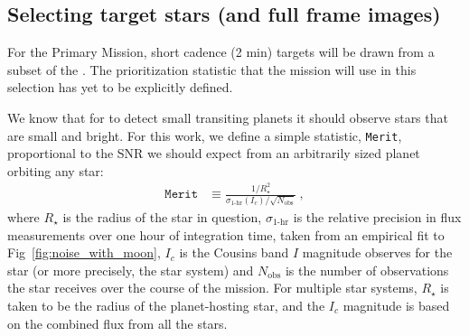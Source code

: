 \subsection{Selecting target stars (and full frame images)}
\label{sec:selection_criteria}
For the Primary Mission, \tesss short cadence (2 min) targets will be drawn from a subset of the \tic. 
The prioritization statistic that the mission will use in this selection has yet to be explicitly defined.

We know that for \tess to detect small transiting planets
it should observe stars that are small and bright.  For this work, we
define a simple statistic, \texttt{Merit}, proportional to the SNR we
should expect from an arbitrarily sized planet orbiting any star:
\begin{align}
\texttt{Merit} &\equiv 
	\frac{1/R_\star^2}{\sigma_\text{1-hr}(I_c)/\sqrt{N_\text{obs}}}\ ,
\label{eq:merit}
\end{align}
where $R_\star$ is the radius of the star in question,
$\sigma_\text{1-hr}$ is the relative precision in flux measurements
over one hour of integration time, taken from an empirical fit to
Fig~\ref{fig:noise_with_moon}, $I_c$ is the Cousins band $I$ magnitude
\tess observes for the star (or more precisely, the star system) and
$N_\text{obs}$ is the number of observations the star receives over
the course of the mission.  For multiple star systems, $R_\star$ is
taken to be the radius of
the planet-hosting star, and the $I_c$ magnitude is based
on the combined flux from all the stars.

